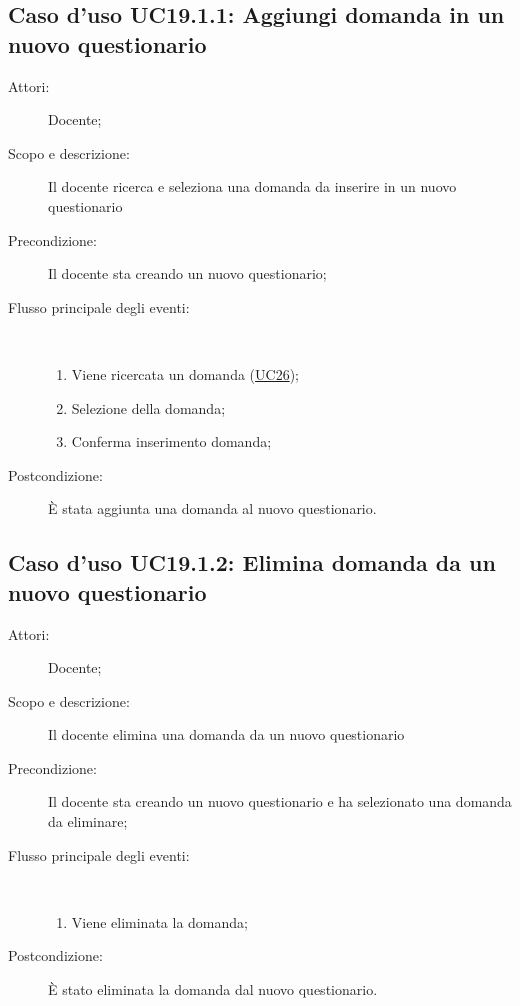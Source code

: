 \subsection{Caso d'uso UC19.1.1: Aggiungi domanda in un nuovo questionario }\begin{description}
\item[Attori:] Docente;
\item[Scopo e descrizione:] Il docente ricerca e seleziona una domanda da inserire in un nuovo questionario
      \item[Precondizione:] Il docente sta creando un nuovo questionario;

        \item[Flusso principale degli eventi:] \ 
 \begin{enumerate}
          \item Viene ricercata un domanda (\hyperlink{UC26}{UC26});
          \item Selezione della domanda;
          \item Conferma inserimento domanda;

      \end{enumerate}
    \item[Postcondizione:] È stata aggiunta una domanda al nuovo questionario.
  \end{description}
\hypertarget{UC19.1.2}{}
\subsection{Caso d'uso UC19.1.2: Elimina domanda da un nuovo questionario}\begin{description}
\item[Attori:] Docente;
\item[Scopo e descrizione:] Il docente elimina una domanda da un nuovo questionario
      \item[Precondizione:] Il docente sta creando un nuovo questionario e ha selezionato una domanda da eliminare;

        \item[Flusso principale degli eventi:] \ 
 \begin{enumerate}
          \item Viene eliminata la domanda;

      \end{enumerate}
    \item[Postcondizione:] È stato eliminata la domanda dal nuovo questionario.
  \end{description}
\hypertarget{UC19.1.3}{}
